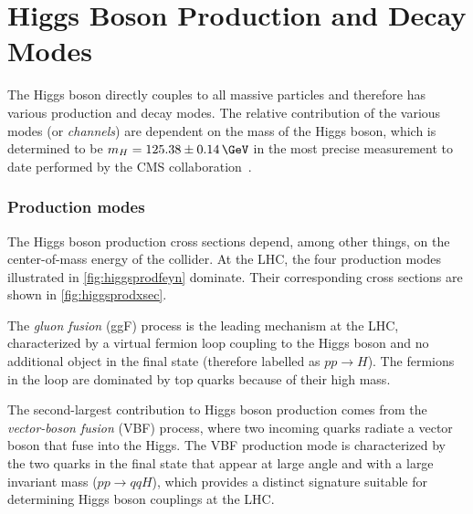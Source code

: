 

\section{Higgs Boson Production and Decay Modes}
\label{subsec:higgschannels}
The Higgs boson directly couples to all massive particles and therefore has various production and decay modes.
The relative contribution of the various modes (or \emph{channels}) are dependent on the mass of the Higgs boson, which is determined to be $m_H = 125.38 \pm 0.14\,\GeV$ in the most precise measurement to date performed by the CMS collaboration~\cite{Sirunyan_2020mass}.

\subsubsection{Production modes} 
The Higgs boson production cross sections depend, among other things, on the center-of-mass energy of the collider.
At the LHC, the four production modes illustrated in \cref{fig:higgsprodfeyn} dominate.
Their corresponding cross sections are shown in \cref{fig:higgsprodxsec}.

The \emph{gluon fusion} (ggF) process is the leading mechanism at the LHC, characterized by a virtual fermion loop coupling to the Higgs boson and no additional object in the final state (therefore labelled as $pp\rightarrow H$). 
The fermions in the loop are dominated by top quarks because of their high mass. 

The second-largest contribution to Higgs boson production comes from the \emph{vector-boson fusion} (VBF) process, where two incoming quarks radiate a vector boson that fuse into the Higgs.
The VBF production mode is characterized by the two quarks in the final state that appear at large angle and with a large invariant mass ($pp\rightarrow qqH$), which provides a distinct signature suitable for determining Higgs boson couplings at the LHC.

